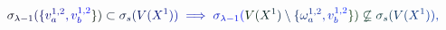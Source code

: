 \documentclass[12pt]{article}
\begin{document}
\makeatletter
\renewcommand*{\@textcolor}[3]{%
  \protect\leavevmode
  \begingroup
    \color#1{#2}#3%
  \endgroup
}
\makeatother
\begin{displaymath}
\mathcolor[RGB]{0,0,15}{\sigma} _ { \mathcolor[RGB]{0,0,30}{\lambda} \mathcolor[RGB]{0,0,45}{-} \mathcolor[RGB]{0,0,60}{1} } \mathcolor[RGB]{0,0,75}{(} \mathcolor[RGB]{0,0,90}{\{} \mathcolor[RGB]{0,0,105}{v} _ { \mathcolor[RGB]{0,0,120}{a} } ^ { \mathcolor[RGB]{0,0,135}{1} \mathcolor[RGB]{0,0,150}{,} \mathcolor[RGB]{0,0,165}{2} } \mathcolor[RGB]{0,0,180}{,} \mathcolor[RGB]{0,0,195}{v} _ { \mathcolor[RGB]{0,0,210}{b} } ^ { \mathcolor[RGB]{0,0,225}{1} \mathcolor[RGB]{0,0,240}{,} \mathcolor[RGB]{0,0,255}{2} } \mathcolor[RGB]{0,15,0}{\}} \mathcolor[RGB]{0,15,15}{)} \mathcolor[RGB]{0,15,30}{\subset} \mathcolor[RGB]{0,15,45}{\sigma} _ { \mathcolor[RGB]{0,15,60}{s} } \mathcolor[RGB]{0,15,75}{(} \mathcolor[RGB]{0,15,90}{V} \mathcolor[RGB]{0,15,105}{(} \mathcolor[RGB]{0,15,120}{X} ^ { \mathcolor[RGB]{0,15,135}{1} } \mathcolor[RGB]{0,15,150}{)} \mathcolor[RGB]{0,15,165}{)} \mathcolor[RGB]{0,15,180}{\implies} \mathcolor[RGB]{0,15,195}{\sigma} _ { \mathcolor[RGB]{0,15,210}{\lambda} \mathcolor[RGB]{0,15,225}{-} \mathcolor[RGB]{0,15,240}{1} } \mathcolor[RGB]{0,15,255}{(} \mathcolor[RGB]{0,30,0}{V} \mathcolor[RGB]{0,30,15}{(} \mathcolor[RGB]{0,30,30}{X} ^ { \mathcolor[RGB]{0,30,45}{1} } \mathcolor[RGB]{0,30,60}{)} \mathcolor[RGB]{0,30,75}{\setminus} \mathcolor[RGB]{0,30,90}{\{} \mathcolor[RGB]{0,30,105}{\omega} _ { \mathcolor[RGB]{0,30,120}{a} } ^ { \mathcolor[RGB]{0,30,135}{1} \mathcolor[RGB]{0,30,150}{,} \mathcolor[RGB]{0,30,165}{2} } \mathcolor[RGB]{0,30,180}{,} \mathcolor[RGB]{0,30,195}{v} _ { \mathcolor[RGB]{0,30,210}{b} } ^ { \mathcolor[RGB]{0,30,225}{1} \mathcolor[RGB]{0,30,240}{,} \mathcolor[RGB]{0,30,255}{2} } \mathcolor[RGB]{0,45,0}{\}} \mathcolor[RGB]{0,45,15}{)} \mathcolor[RGB]{0,45,30}{\not\subsetneq} \mathcolor[RGB]{0,45,45}{\sigma} _ { \mathcolor[RGB]{0,45,60}{s} } \mathcolor[RGB]{0,45,75}{(} \mathcolor[RGB]{0,45,90}{V} \mathcolor[RGB]{0,45,105}{(} \mathcolor[RGB]{0,45,120}{X} ^ { \mathcolor[RGB]{0,45,135}{1} } \mathcolor[RGB]{0,45,150}{)} \mathcolor[RGB]{0,45,165}{)} \mathcolor[RGB]{0,45,180}{,}
\end{displaymath}
\end{document}
